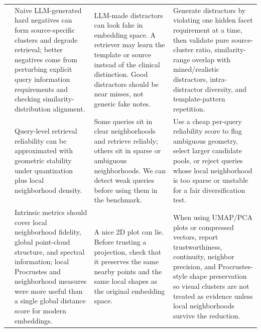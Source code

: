 \documentclass[11pt,a4paper]{article}
\begin{document}
\begin{longtable}{@{}p{1.95cm}p{4.3cm}p{4.3cm}p{4.3cm}@{}}
	\citet{zhangWhenHardNegatives2026} & Naive LLM-generated hard negatives can form source-specific clusters and degrade retrieval; better negatives come from perturbing explicit query information requirements and checking similarity-distribution alignment. & LLM-made distractors can look fake in embedding space. A retriever may learn the template or source instead of the clinical distinction. Good distractors should be near misses, not generic fake notes. & Generate distractors by violating one hidden facet requirement at a time, then validate pure source-cluster ratio, similarity-range overlap with mined/realistic distractors, intra-distractor diversity, and template-pattern repetition. \\

	\citet{duSemanticCertaintyAssessment2025} & Query-level retrieval reliability can be approximated with geometric stability under quantization plus local neighborhood density. & Some queries sit in clear neighborhoods and retrieve reliably; others sit in sparse or ambiguous neighborhoods. We can detect weak queries before using them in the benchmark. & Use a cheap per-query reliability score to flag ambiguous geometry, select larger candidate pools, or reject queries whose local neighborhood is too sparse or unstable for a fair diversification test. \\

	\citet{inkiriwangWeReallyNeed2025} & Intrinsic metrics should cover local neighborhood fidelity, global point-cloud structure, and spectral information; local Procrustes and neighborhood measures were more useful than a single global distance score for modern embeddings. & A nice 2D plot can lie. Before trusting a projection, check that it preserves the same nearby points and the same local shapes as the original embedding space. & When using UMAP/PCA plots or compressed vectors, report trustworthiness, continuity, neighbor precision, and Procrustes-style shape preservation so visual clusters are not treated as evidence unless local neighborhoods survive the reduction. \\


\end{longtable}
\end{document}
